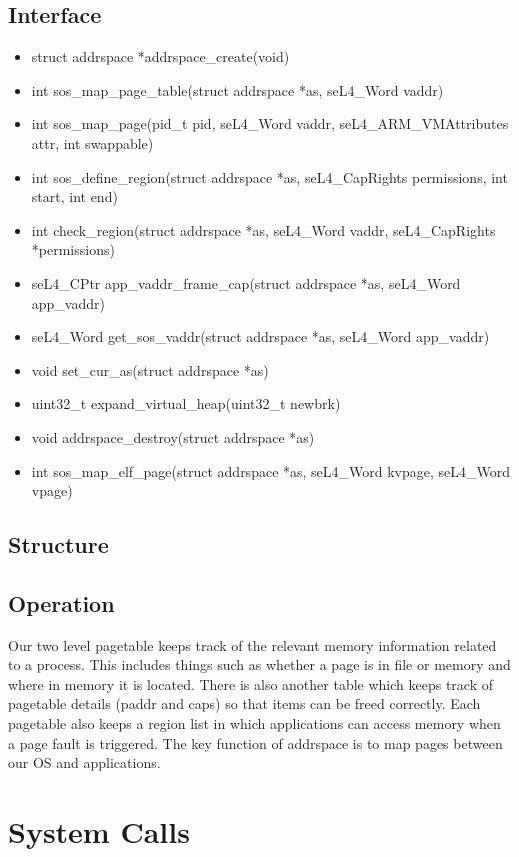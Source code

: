 \documentclass[12pt]{article}
\begin{document}
\subsection{Interface}
\begin{itemize}
\item struct addrspace *addrspace\_create(void)
\item int sos\_map\_page\_table(struct addrspace *as, seL4\_Word vaddr)
\item int sos\_map\_page(pid\_t pid, seL4\_Word vaddr, seL4\_ARM\_VMAttributes attr, int swappable)
\item int sos\_define\_region(struct addrspace *as, seL4\_CapRights permissions, int start, int end)
\item int check\_region(struct addrspace *as, seL4\_Word vaddr, seL4\_CapRights *permissions)
\item seL4\_CPtr app\_vaddr\_frame\_cap(struct addrspace *as, seL4\_Word app\_vaddr)
\item seL4\_Word get\_sos\_vaddr(struct addrspace *as, seL4\_Word app\_vaddr)
\item void set\_cur\_as(struct addrspace *as)
\item uint32\_t expand\_virtual\_heap(uint32\_t newbrk)
\item void addrspace\_destroy(struct addrspace *as)
\item int sos\_map\_elf\_page(struct addrspace *as, seL4\_Word kvpage, seL4\_Word vpage)
\end{itemize}
\subsection{Structure}
\subsection{Operation}
Our two level pagetable keeps track of the relevant memory information related to a process. This includes things such as whether a page is in file or memory and where in memory it is located. There is also another table which keeps track of pagetable details (paddr and caps) so that items can be freed correctly. Each pagetable also keeps a region list in which applications can access memory when a page fault is triggered. 
The key function of addrspace is to map pages between our OS and applications.

\clearpage
\section{System Calls}
\end{document}
